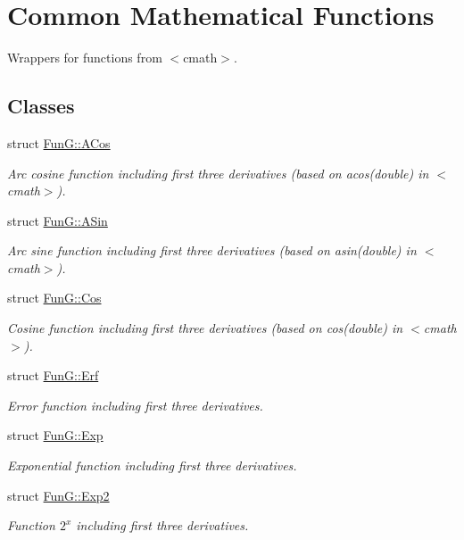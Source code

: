 \hypertarget{group__CMathGroup}{}\section{Common Mathematical Functions}
\label{group__CMathGroup}


Wrappers for functions from $<$cmath$>$.  


\subsection*{Classes}
\begin{DoxyCompactItemize}
\item 
struct \hyperlink{structFunG_1_1ACos}{Fun\+G\+::\+A\+Cos}
\begin{DoxyCompactList}\small\item\em Arc cosine function including first three derivatives (based on acos(double) in $<$cmath$>$). \end{DoxyCompactList}\item 
struct \hyperlink{structFunG_1_1ASin}{Fun\+G\+::\+A\+Sin}
\begin{DoxyCompactList}\small\item\em Arc sine function including first three derivatives (based on asin(double) in $<$cmath$>$). \end{DoxyCompactList}\item 
struct \hyperlink{structFunG_1_1Cos}{Fun\+G\+::\+Cos}
\begin{DoxyCompactList}\small\item\em Cosine function including first three derivatives (based on cos(double) in $<$cmath$>$). \end{DoxyCompactList}\item 
struct \hyperlink{structFunG_1_1Erf}{Fun\+G\+::\+Erf}
\begin{DoxyCompactList}\small\item\em Error function including first three derivatives. \end{DoxyCompactList}\item 
struct \hyperlink{structFunG_1_1Exp}{Fun\+G\+::\+Exp}
\begin{DoxyCompactList}\small\item\em Exponential function including first three derivatives. \end{DoxyCompactList}\item 
struct \hyperlink{structFunG_1_1Exp2}{Fun\+G\+::\+Exp2}
\begin{DoxyCompactList}\small\item\em Function $2^x$ including first three derivatives. \end{DoxyCompactList}\item 

\end{DoxyCompactItemize}
